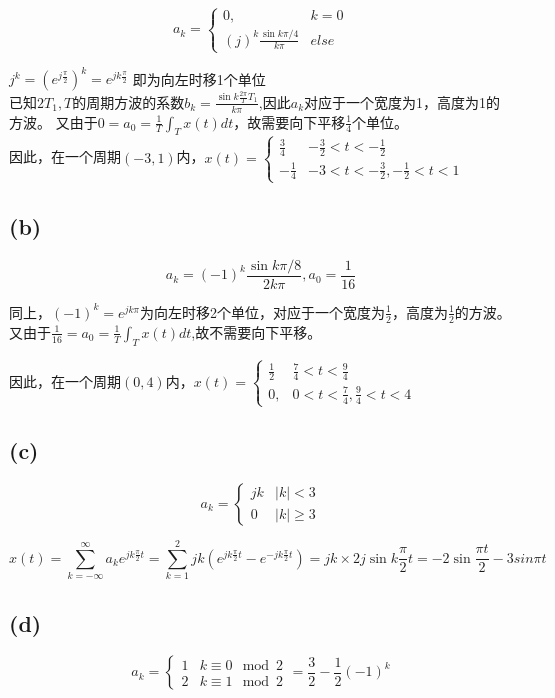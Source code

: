 \documentclass[UTF8,fontset=fandol,12pt,a4paper]{ctexart}
\begin{document}
\[
a_k=\begin{cases}
  0, &k=0 \\
  {(j)}^k \frac{\sin{k\pi/4}}{k\pi} &else
\end{cases}
\]

\noindent $j^k=(e^{j\frac{\pi}{2}})^k=e^{jk\frac{\pi}{2}}$ 即为向左时移1个单位\\
已知$2T_1,T$的周期方波的系数$b_k=\frac{\sin{k\frac{2\pi}{T}T_1}}{k\pi}$,因此$a_k$对应于一个宽度为1，高度为1的方波。
又由于$0=a_0=\frac{1}{T}\int_{T}x(t)dt$，故需要向下平移$\frac{1}{4}$个单位。\\

\noindent 因此，在一个周期$(-3,1)$内，$x(t)=\begin{cases}
  \frac{3}{4} &-\frac{3}{2}<t<-\frac{1}{2} \\
  -\frac{1}{4} &-3<t<-\frac{3}{2}, -\frac{1}{2}<t<1
\end{cases}$

\subsection*{(b)}

\[a_k={(-1)}^k\frac{\sin{k\pi/8}}{2k\pi},a_0=\frac{1}{16}\]

\noindent 同上，${(-1)}^k=e^{jk\pi}$为向左时移2个单位，对应于一个宽度为$\frac{1}{2}$，高度为$\frac{1}{2}$的方波。又由于$\frac{1}{16}=a_0=\frac{1}{T}\int_{T}x(t)dt$,故不需要向下平移。

\noindent 因此，在一个周期$(0,4)$内，$x(t)=\begin{cases}
  \frac{1}{2} &\frac{7}{4}<t<\frac{9}{4} \\
  0, &0<t<\frac{7}{4}, \frac{9}{4}<t<4
\end{cases}$

\subsection*{(c)}

\[a_k=\begin{cases}
  jk &|k|<3\\
  0 &|k|\ge 3
\end{cases}\]

$$x(t)=\sum_{k=-\infty}^{\infty}a_ke^{jk\frac{\pi}{2}t}=\sum_{k=1}^{2}jk(e^{jk\frac{\pi}{2}t}-e^{-jk\frac{\pi}{2}t})=jk\times 2j\sin{k\frac{\pi}{2}t}=-2\sin{\frac{\pi t}{2}}-3sin{\pi t}$$

\subsection*{(d)}
$$a_k=\begin{cases}
  1 &k\equiv 0\mod 2 \\
  2 &k\equiv 1\mod 2
\end{cases}=\frac{3}{2}-\frac{1}{2}{(-1)}^k$$
\end{document}
